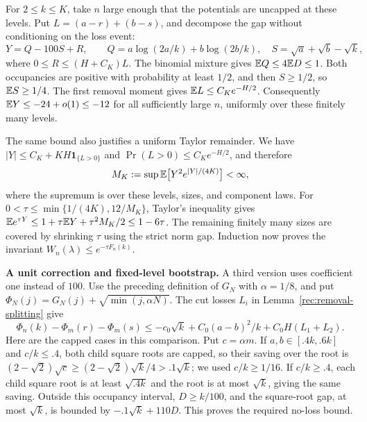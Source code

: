 For $2\le k\le K$, take $n$ large enough that the potentials are
uncapped at these levels.  Put $L=(a-r)+(b-s)$, and decompose the
gap without conditioning on the loss event:
\[
 Y=Q-100S+R,\qquad
 Q=a\log(2a/k)+b\log(2b/k),\quad
 S=\sqrt a+\sqrt b-\sqrt k,
\]
where $0\le R\le(H+C_K)L$.  The binomial mixture gives
$\mathbb E Q\le4\mathbb E D\le1$.  Both occupancies are positive with probability
at least $1/2$, and then $S\ge1/2$, so $\mathbb E S\ge1/4$.
The first removal moment gives $\mathbb E L\le C_K e^{-H/2}$.
Consequently $\mathbb E Y\le-24+o(1)\le-12$ for all sufficiently large $n$,
uniformly over these finitely many levels.

The same bound also justifies a uniform Taylor remainder.  We have
$|Y|\le C_K+KH\mathbf1_{\{L>0\}}$ and
$\Pr(L>0)\le C_K e^{-H/2}$, and therefore
\[
 M_K:=\sup\mathbb E\big[Y^2e^{|Y|/(4K)}\big]<\infty,
\]
where the supremum is over these levels, sizes, and component laws.
For $0<\tau\le\min\{1/(4K),12/M_K\}$, Taylor's inequality gives
$\mathbb E e^{\tau Y}\le1+\tau\mathbb E Y+\tau^2 M_K/2\le1-6\tau$.
The remaining finitely many sizes are covered by shrinking $\tau$ using
the strict norm gap.  Induction now proves the invariant
$W_n(\lambda)\le e^{-\tau F_n(k)}$.

\medskip\noindent\textbf{A unit correction and fixed-level bootstrap.}\enspace
A third version uses coefficient one instead of $100$.  Use the
preceding definition of $G_N$ with $\alpha=1/8$, and put
$\Phi_N(j)=G_N(j)+\sqrt{\min(j,\alpha N)}$.
The cut losses $L_i$ in Lemma~\ref{rec:removal-splitting} give
\begin{equation}\label{rec:sqrt-unit-drift}
 \Phi_n(k)-\Phi_m(r)-\Phi_m(s)
 \le-c_0\sqrt k+C_0(a-b)^2/k+C_0H(L_1+L_2).
\end{equation}
Here are the capped cases in this comparison.  Put $c=\alpha m$.
If $a,b\in[.4k,.6k]$ and $c/k\le.4$, both child square roots are
capped, so their saving over the root is
$(2-\sqrt2)\sqrt c\ge(2-\sqrt2)\sqrt k/4>.1\sqrt k$;
we used $c/k\ge1/16$.  If $c/k\ge.4$, each child square root
is at least $\sqrt{.4k}$ and the root is at most $\sqrt k$, giving
the same saving.  Outside this occupancy interval, $D\ge k/100$,
and the square-root gap, at most $\sqrt k$, is bounded by
$-.1\sqrt k+110D$.  This proves the required no-loss bound.

